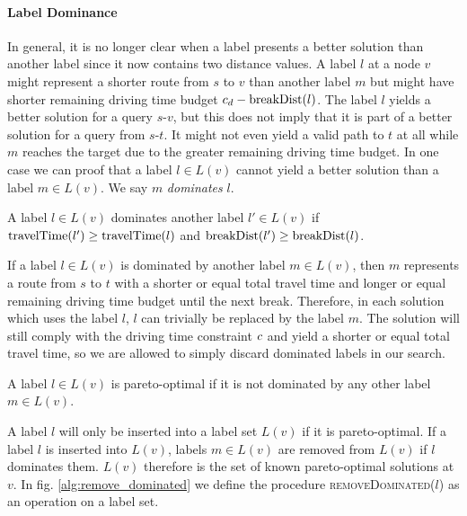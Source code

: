 \paragraph{Label Dominance}
In general, it is no longer clear when a label presents a better solution than another label since it now contains two distance values. A label $l$ at a node $v$ might represent a shorter route from $s$ to $v$ than another label $m$ but might have shorter remaining driving time budget $c_d - \operatorname{breakDist}(l)$. The label $l$ yields a better solution for a query $s$-$v$, but this does not imply that it is part of a better solution for a query from $s$-$t$. It might not even yield a valid path to $t$ at all while $m$ reaches the target due to the greater remaining driving time budget. In one case we can proof that a label $l \in L(v)$ cannot yield a better solution than a label $m \in L(v)$. We say $m$ \emph{dominates} $l$.

\begin{definition}
	A label $l \in L(v)$ dominates another label $l' \in L(v)$ if $\operatorname{travelTime}(l') \ge \operatorname{travelTime}(l)$ and $\operatorname{breakDist}(l') \ge \operatorname{breakDist}(l)$.
\end{definition}

If a label $l \in L(v)$ is dominated by another label $m \in L(v)$, then $m$ represents a route from $s$ to $t$ with a shorter or equal total travel time and longer or equal remaining driving time budget until the next break. Therefore, in each solution which uses the label $l$, $l$ can trivially be replaced by the label $m$. The solution will still comply with the driving time constraint $c$ and yield a shorter or equal total travel time, so we are allowed to simply discard dominated labels in our search.

\begin{definition}
	A label $l \in L(v)$ is pareto-optimal if it is not dominated by any other label $m \in L(v)$.
\end{definition}

A label $l$ will only be inserted into a label set $L(v)$ if it is pareto-optimal. If a label $l$ is inserted into $L(v)$, labels $m \in L(v)$ are removed from $L(v)$ if $l$ dominates them. $L(v)$ therefore is the set of known pareto-optimal solutions at $v$. In fig. \ref{alg:remove_dominated} we define the procedure \textsc{removeDominated($l$)} as an operation on a label set.


